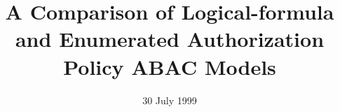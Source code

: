 \documentclass[11 pt]{llncs}
\begin{document}


\title{A Comparison of Logical-formula and Enumerated Authorization Policy ABAC Models}


\date{30 July 1999}

\maketitle









%





\vspace{-2em}
\end{document}

